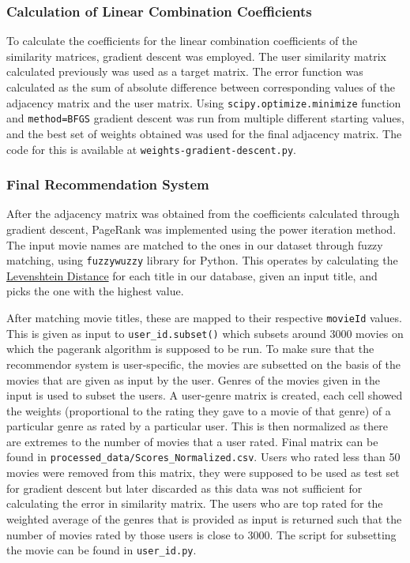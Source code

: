\documentclass[11pt]{article}
\begin{document}
    \hypertarget{calculation-of-linear-combination-coefficients}{%
\subsubsection{Calculation of Linear Combination
Coefficients}\label{calculation-of-linear-combination-coefficients}}

To calculate the coefficients for the linear combination coefficients of
the similarity matrices, gradient descent was employed. The user
similarity matrix calculated previously was used as a target matrix. The
error function was calculated as the sum of absolute difference between
corresponding values of the adjacency matrix and the user matrix. Using
\texttt{scipy.optimize.minimize} function and
\texttt{method=\textquotesingle{}BFGS\textquotesingle{}} gradient
descent was run from multiple different starting values, and the best
set of weights obtained was used for the final adjacency matrix. The
code for this is available at \texttt{weights-gradient-descent.py}.

    \hypertarget{final-recommendation-system}{%
\subsubsection{Final Recommendation
System}\label{final-recommendation-system}}

After the adjacency matrix was obtained from the coefficients calculated
through gradient descent, PageRank was implemented using the power
iteration method. The input movie names are matched to the ones in our
dataset through fuzzy matching, using \texttt{fuzzywuzzy} library for
Python. This operates by calculating the
\href{https://en.wikipedia.org/wiki/Levenshtein_distance}{Levenshtein
Distance} for each title in our database, given an input title, and
picks the one with the highest value.

After matching movie titles, these are mapped to their respective
\texttt{movieId} values. This is given as input to
\texttt{user\_id.subset()} which subsets around 3000 movies on which the
pagerank algorithm is supposed to be run. To make sure that the
recommendor system is user-specific, the movies are subsetted on the
basis of the movies that are given as input by the user. Genres of the
movies given in the input is used to subset the users. A user-genre
matrix is created, each cell showed the weights (proportional to the
rating they gave to a movie of that genre) of a particular genre as
rated by a particular user. This is then normalized as there are
extremes to the number of movies that a user rated. Final matrix can be
found in \texttt{processed\_data/Scores\_Normalized.csv}. Users who
rated less than 50 movies were removed from this matrix, they were
supposed to be used as test set for gradient descent but later discarded
as this data was not sufficient for calculating the error in similarity
matrix. The users who are top rated for the weighted average of the
genres that is provided as input is returned such that the number of
movies rated by those users is close to 3000. The script for subsetting
the movie can be found in \texttt{user\_id.py}.
\end{document}
